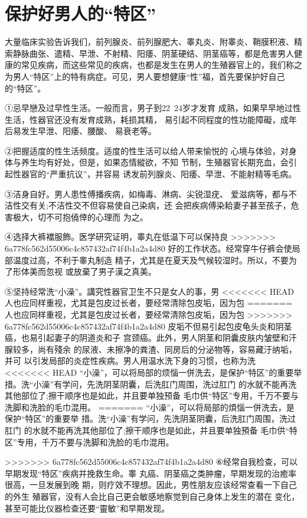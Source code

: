 \documentclass[12pt,UTF8]{ctexbook}
\begin{document}
\section{保护好男人的“特区”}

大量临床实验告诉我们，前列腺炎、前列腺肥大、睾丸炎、附睾炎、鞘膜积液、精索静脉曲张、遣精、早泄、不射精、阳痿、阴茎硬结、阴茎癌等，都是危害男人健康的常见疾病，而这些常见的疾病，也都是发生在男人的生殖器官上的，我们称之为男人“特区”上的特有病症。可见，男人要想健康“性”福，首先要保护好自己的“特区”。

①忌早戀及过早性生活。一般而言，男子到22~24岁才发育
成熟，如果早早地过性生活，性器官还没有发育成熟，耗损其精，
易引起不同程度的性功能障礙，成年后易发生早泄、阳痿、腰酸、
易衰老等。

②把握适度的性生活频度。适度的性生活可以给人带来愉悦的
心境与体验，对身体与养生均有好处，但是，如果态情縱欲，不知
节制，生殖器官长期充血，会引起性器官的“严重抗议”，并容易
诱发前列腺炎、阳痿、早泄、不能射精等毛病。

③洁身自好。男人患性傅播疾病，如梅毒、淋病、尖锐湿疣、
爱滋病等，都与不洁性交有关;不洁性交不但容易使自己染病，还
会把疾病傅染耠妻子甚至孩子，危害极大，切不可抱僥倖的心理而
为之。

④选择大裤襠服飾。医学研究证明，睾丸在低温下可以保持良
>>>>>>> 6a778fc562d55006c4c857432af74f4b1a2a4d80
好的工作状态。经常穿牛仔裤会使局部温度过高，不利于睾丸制造
精子，尤其是在夏天及气候较湿时。所以，不要为了形体美而忽视
或放棄了男子漢之真美。

⑤坚持经常洗“小澡”。講究性器官卫生不只是女人的事，男
<<<<<<< HEAD
人也应同样重视，尤其是包皮过长者，要经常清除包皮垢，因为包
=======
人也应同样重视，尤其是包皮过长者，要经常清除包皮垢，因为包
>>>>>>> 6a778fc562d55006c4c857432af74f4b1a2a4d80
皮垢不但易引起包皮龟头炎和阴茎癌，也易引起妻子的阴道炎和子
宫颈癌。此外，男人阴茎和阴囊皮肤内皱壁和汗腺较多，尚有殘余
的尿液、未擦净的粪渣、同房后的分泌物等，容易藏汙纳垢，并可
以引发局部的炎症性疾病。男人用温水洗下身的习惯，也称为洗
<<<<<<< HEAD
“小澡”，可以将局部的烦惱一併洗去，是保护“特区”的重要举
措。洗“小澡”有学问，先洗阴茎阴囊，后洗肛门周围，洗过肛门
的水就不能再洗其他部位了;擦干顺序也是如此，并且要单独预备
毛巾供“特区”专用，千万不要与洗脚和洗脸的毛巾混用。
=======
“小澡”，可以将局部的煩惱一併洗去，是保护“特区”的重要举
措。洗“小澡”有学问，先洗阴茎阴囊，后洗肛门周围，洗过肛门
的水就不能再洗其他部位了;擦干顺序也是如此，并且要单独預备
毛巾供“特区”专用，千万不要与洗脚和洗脸的毛巾混用。

>>>>>>> 6a778fc562d55006c4c857432af74f4b1a2a4d80
⑥经常自我检查，可以早期发现“特区”疾病并挽救生命。睾
丸癌、阴茎癌之类肿瘤，早期发现的治癒率很高，一旦发展到晚
期，则疗效不理想。因此，男性朋友应该经常查看一下自己的外生
殖器官，没有人会比自己更会敏感地察觉到自己身体上发生的潜在
变化，甚至可能比仪器检查还要“靈敏”和早期发现。
\end{document}

